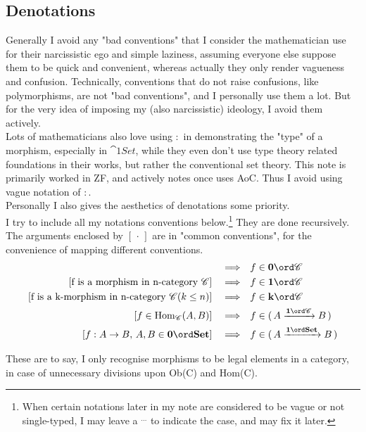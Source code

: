 \subsection{Denotations}

Generally I avoid any "bad conventions" that I consider the mathematician use for their narcissistic ego and simple laziness, assuming everyone else suppose them to be quick and convenient, whereas actually they only render vagueness and confusion. Technically, conventions that do not raise confusions, like polymorphisms, are not "bad conventions", and I personally use them a lot. But for the very idea of imposing my (also narcissistic) ideology, I avoid them actively.\\

Lots of mathematicians also love using \(:\) in demonstrating the "type" of a morphism, especially in \(\cat{1}{Set}\), while they even don't use type theory related foundations in their works, but rather the conventional set theory. This note is primarily worked in ZF, and actively notes once uses AoC. Thus I avoid using vague notation of \(:\). \\

Personally I also gives the aesthetics of denotations some priority.\\

I try to include all my notations conventions below.\footnote[1]{When certain notations later in my note are considered to be vague or not single-typed, I may leave a \(^{\ldots}\) to indicate the case, and may fix it later.} They are done recursively. The arguments enclosed by \([\,\cdot\,]\) are in "common conventions", for the convenience of mapping different conventions. \\

\begin{align}
  [\text{f is an object in n-category }\cc] \corres & f\in \cat{0}{\cc} \\
  [\text{f is a morphism in n-category }\cc] \corres & f\in \cat{1}{\cc} \\
  [\text{f is a k-morphism in n-category }\cc (k\leq n)] \corres & f\in \cat{k}{\cc} \\
  [f\in \operatorname{Hom}_{\mathscr{C}}(A,B)] \corres & f\in (\, A \morp{\cc} B\,) \\
  [f: A\to B,\, {A, B}\in \cat{0}{Set}] \corres & f\in (\, A \func B\,) 
\end{align}

These are to say, I only recognise morphisms to be legal elements in a category, in case of unnecessary divisions upon Ob(C) and Hom(C). \\

